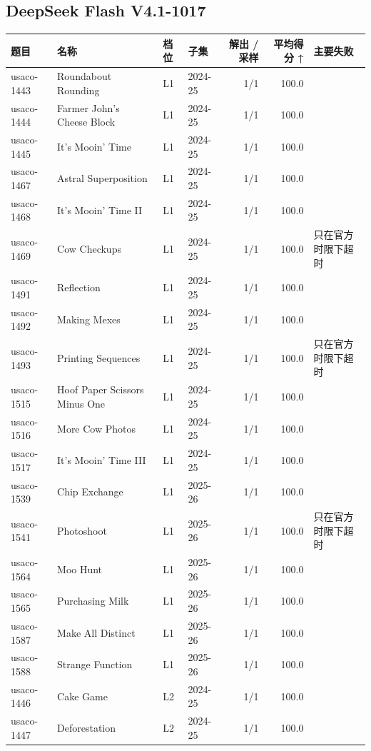 \documentclass[11pt,a4paper,fontset=none]{ctexart}
\begin{document}
\subsection*{DeepSeek Flash V4.1-1017}
{\footnotesize\setlength{\tabcolsep}{4pt}\begin{longtable}{@{}l>{\raggedright\arraybackslash}p{3.4cm}llrr>{\raggedright\arraybackslash}p{3.1cm}@{}}
\toprule
题目 & 名称 & 档位 & 子集 & 解出 / 采样 & 平均得分 ↑ & 主要失败 \\
\midrule\endhead
usaco-1443 & Roundabout Rounding & L1 & 2024-25 & 1/1 & 100.0 &  \\
usaco-1444 & Farmer John's Cheese Block & L1 & 2024-25 & 1/1 & 100.0 &  \\
usaco-1445 & It's Mooin' Time & L1 & 2024-25 & 1/1 & 100.0 &  \\
usaco-1467 & Astral Superposition & L1 & 2024-25 & 1/1 & 100.0 &  \\
usaco-1468 & It's Mooin' Time II & L1 & 2024-25 & 1/1 & 100.0 &  \\
usaco-1469 & Cow Checkups & L1 & 2024-25 & 1/1 & 100.0 & 只在官方时限下超时 \\
usaco-1491 & Reflection & L1 & 2024-25 & 1/1 & 100.0 &  \\
usaco-1492 & Making Mexes & L1 & 2024-25 & 1/1 & 100.0 &  \\
usaco-1493 & Printing Sequences & L1 & 2024-25 & 1/1 & 100.0 & 只在官方时限下超时 \\
usaco-1515 & Hoof Paper Scissors Minus One & L1 & 2024-25 & 1/1 & 100.0 &  \\
usaco-1516 & More Cow Photos & L1 & 2024-25 & 1/1 & 100.0 &  \\
usaco-1517 & It's Mooin' Time III & L1 & 2024-25 & 1/1 & 100.0 &  \\
usaco-1539 & Chip Exchange & L1 & 2025-26 & 1/1 & 100.0 &  \\
usaco-1541 & Photoshoot & L1 & 2025-26 & 1/1 & 100.0 & 只在官方时限下超时 \\
usaco-1564 & Moo Hunt & L1 & 2025-26 & 1/1 & 100.0 &  \\
usaco-1565 & Purchasing Milk & L1 & 2025-26 & 1/1 & 100.0 &  \\
usaco-1587 & Make All Distinct & L1 & 2025-26 & 1/1 & 100.0 &  \\
usaco-1588 & Strange Function & L1 & 2025-26 & 1/1 & 100.0 &  \\
usaco-1446 & Cake Game & L2 & 2024-25 & 1/1 & 100.0 &  \\
usaco-1447 & Deforestation & L2 & 2024-25 & 1/1 & 100.0 &  \\

\end{longtable}}
\end{document}
